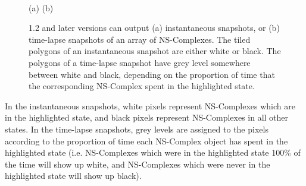 \begin{figure}
\begin{center}
\hspace{1cm}
\\
(a) \hspace{4cm} (b)
\end{center}
\caption{\stochsim{} 1.2 and later versions can output
  (a) instantaneous snapshots, or (b) time-lapse snapshots of an array
  of NS-Complexes.  The tiled polygons of an instantaneous snapshot
  are either white or black.  The polygons of a time-lapse snapshot
  have grey level somewhere between white and black, depending on the
  proportion of time that the corresponding NS-Complex spent in the
  highlighted state.}
\label{fig-snapshots}
\end{figure}

In the instantaneous snapshots, white pixels represent NS-Complexes
which are in the highlighted state, and black pixels represent
NS-Complexes in all other states.  In the time-lapse snapshots, grey
levels are assigned to the pixels according to the proportion of time
each NS-Complex object has spent in the highlighted state (i.e.
NS-Complexes which were in the highlighted state 100\% of the time
will show up white, and NS-Complexes which were never in the
highlighted state will show up black).

